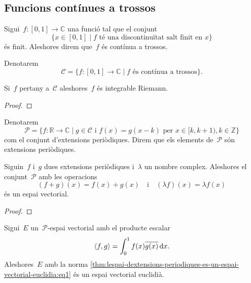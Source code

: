 \documentclass[../../main.tex]{subfiles}
\begin{document}
    \subsection{Funcions contínues a trossos}
    \begin{definition}
        \label{def:funcio-continua-a-trossos}
        Sigui~\(f\colon[0,1]\longrightarrow\mathbb{C}\) una funció tal que el conjunt
        \[
            \{x\in[0,1]\mid f\text{ té una discontinuïtat salt finit en }x\}
        \]
        és finit.
        Aleshores direm que~\(f\) és contínua a trossos.

        Denotarem
        \[
            \mathcal{C}=\{f\colon[0,1]\longrightarrow\mathbb{C}\mid f\text{ és contínua a trossos}\}.
        \]
    \end{definition}
    \begin{observation}
        \label{obs:les-funcions-continues-a-trossos-son-integrables}
        Si~\(f\) pertany a~\(\mathcal{C}\) aleshores~\(f\) és integrable Riemann.
    \end{observation}
    \begin{proof}
    \end{proof}
    \begin{definition}
        \label{def:conjunt-dextensions-periodiques}
        Denotarem
        \label{def:extensio-periodica}
        \[
            \mathcal{P}=\{f\colon\mathbb{R}\longrightarrow\mathbb{C}\mid g\in\mathcal{C}\text{ i }f(x)=g(x-k)\text{ per }x\in[k,k+1),k\in\mathbb{Z}\}
        \]
        com el conjunt d'extensions periòdiques.
        Direm que els elements de~\(\mathcal{P}\) són extensions periòdiques.
    \end{definition}
    \begin{lemma}
        \label{lema:lespai-dextensions-periodiques-es-un-espai-vectorial}
        Siguin~\(f\) i~\(g\) dues extensions periòdiques i~\(\lambda\) un nombre complex.
        Aleshores el conjunt~\(\mathcal{P}\) amb les operacions
        \[
            (f+g)(x)=f(x)+g(x)\quad\text{i}\quad(\lambda f)(x)=\lambda f(x)
        \]
        és un espai vectorial.
    \end{lemma}
    \begin{proof}
    \end{proof}
    \begin{theorem}
        \label{thm:lespai-dextensions-periodiques-es-un-espai-vectorial-euclidia}
        Sigui~\(E\) un~\(\mathcal{P}\)-espai vectorial amb el producte escalar
        \begin{equation}
            \label{thm:lespai-dextensions-periodiques-es-un-espai-vectorial-euclidia:eq1}
            \langle f,g\rangle=\int_{0}^{1}f(x)\overline{g(x)}\mathop{}\!\mathrm{d} x.
        \end{equation}
        Aleshores~\(E\) amb la norma \eqref{thm:lespai-dextensions-periodiques-es-un-espai-vectorial-euclidia:eq1} és un espai vectorial euclidià.
    \end{theorem}
\end{document}
